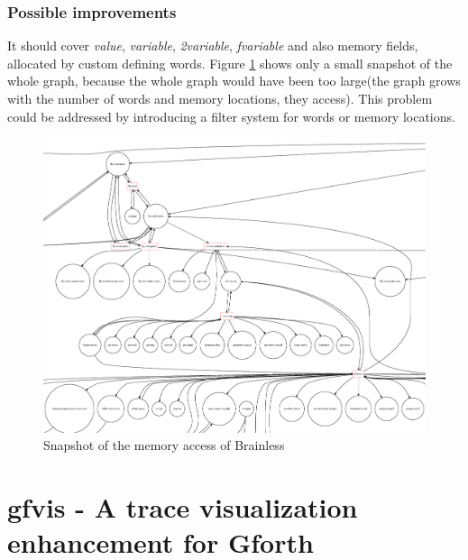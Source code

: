 \subsubsection*{Possible improvements}

It should cover \emph{value}, \emph{variable}, \emph{2variable}, \emph{fvariable} and also memory fields, allocated by custom defining words. Figure \ref{fig:taxonomy} shows only a small snapshot of the whole graph, because the whole graph would have been too large(the graph grows with the number of words and memory locations, they access). This problem could be addressed by introducing a filter system for words or memory locations.

\begin{figure}[p]
    \centering
    \includegraphics[scale=0.20]{graphics/taxonomy_view2.png}
    \caption{Snapshot of the memory access of Brainless}
    \label{fig:taxonomy}
\end{figure}

\section{gfvis - A trace visualization enhancement for Gforth}

